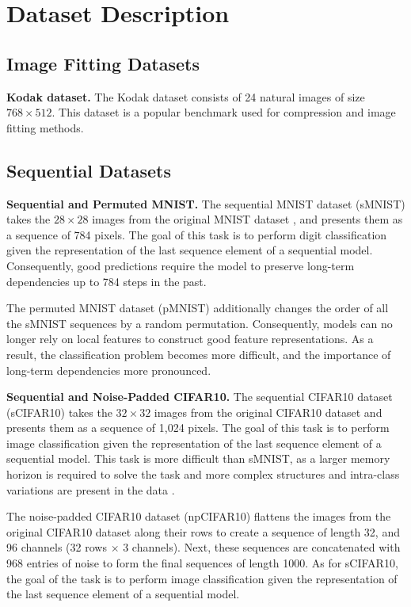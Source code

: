 \documentclass{article} \usepackage{iclr2022_conference,times}
\begin{document}
\section{Dataset Description}
\label{sec:datasets}

\subsection{Image Fitting Datasets}
\textbf{Kodak dataset.} The Kodak dataset \citep{kodak1991} consists of 24 natural images of size $768\times512$. This dataset is a popular benchmark used for compression and image fitting methods.

\subsection{Sequential Datasets}
\textbf{Sequential and Permuted MNIST.} The sequential MNIST dataset (sMNIST) \citep{le2015simple}takes the $28{\times}28$ images from the original MNIST dataset \citep{lecun1998gradient}, and presents them as a sequence of 784 pixels. The goal of this task is to perform digit classification given the representation of the last sequence element of a sequential model. Consequently, good predictions require the model to preserve long-term dependencies up to 784 steps in the past.

The permuted MNIST dataset (pMNIST) additionally changes the order of all the sMNIST sequences by a random permutation. Consequently, models can no longer rely on local features to construct good feature representations. As a result, the classification problem becomes more difficult, and the importance of long-term dependencies more pronounced.

\textbf{Sequential and Noise-Padded CIFAR10.} The sequential CIFAR10 dataset (sCIFAR10) \citep{chang2017dilated} takes the $32{\times}32$ images from the original CIFAR10 dataset \citep{krizhevsky2009learning} and presents them as a sequence of 1,024 pixels. The goal of this task is to perform image classification given the representation of the last sequence element of a sequential model. This task is more difficult than sMNIST, as a larger memory horizon is required to solve the task and more complex structures and intra-class variations are present in the data \citep{bai2018trellis}. 

The noise-padded CIFAR10 dataset (npCIFAR10) \citep{chang2019antisymmetricrnn} flattens the images from the original CIFAR10 dataset \citep{krizhevsky2009learning} along their rows to create a sequence of length 32, and 96 channels (32 rows $\times$ 3 channels). Next, these sequences are concatenated with 968 entries of noise to form the final sequences of length 1000. As for sCIFAR10, the goal of the task is to perform image classification given the representation of the last sequence element of a sequential model. 
\end{document}
